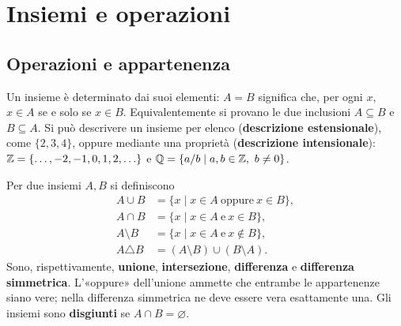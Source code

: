 \chapter{Insiemi e operazioni}

\section{Operazioni e appartenenza}
Un insieme è determinato dai suoi elementi: $A=B$ significa che, per ogni $x$, $x\in A$ se e solo se $x\in B$. Equivalentemente si provano le due inclusioni $A\subseteq B$ e $B\subseteq A$. Si può descrivere un insieme per elenco (\textbf{descrizione estensionale}), come $\{2,3,4\}$, oppure mediante una proprietà (\textbf{descrizione intensionale}): $\mathbb{Z}=\{\ldots,-2,-1,0,1,2,\ldots\}$ e $\mathbb{Q}=\{a/b\mid a,b\in\mathbb{Z},\ b\ne0\}$.

\begin{definizione}
Per due insiemi $A,B$ si definiscono
\[
\begin{aligned}
A\cup B&=\{x\mid x\in A\ \text{oppure}\ x\in B\},\\
A\cap B&=\{x\mid x\in A\ \text{e}\ x\in B\},\\
A\setminus B&=\{x\mid x\in A\ \text{e}\ x\notin B\},\\
A\triangle B&=(A\setminus B)\cup(B\setminus A).
\end{aligned}
\]
Sono, rispettivamente, \textbf{unione}, \textbf{intersezione}, \textbf{differenza} e \textbf{differenza simmetrica}. L'«oppure» dell'unione ammette che entrambe le appartenenze siano vere; nella differenza simmetrica ne deve essere vera esattamente una. Gli insiemi sono \textbf{disgiunti} se $A\cap B=\varnothing$.
\end{definizione}

\begin{schema}
\end{schema}

